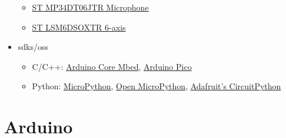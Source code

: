 \documentclass[aspectratio=169]{beamer}
\begin{document}
\begin{frame}
\begin{itemize}
\begin{itemize}
                  \item \href{https://www.st.com/resource/en/datasheet/mp34dt06j.pdf}{ST MP34DT06JTR  Microphone}
                  \item \href{https://www.st.com/resource/en/datasheet/lsm6dsox.pdf}{ST LSM6DSOXTR 6-axis }
              \end{itemize}
        \item \aclp{sdk}/\aclp{os}
              \begin{itemize}
                  \item C/C++: \href{https://github.com/arduino/ArduinoCore-mbed/releases/tag/2.0.0}{Arduino\textregistered{} Core Mbed}, \href{https://github.com/earlephilhower/arduino-pico}{Arduino\textregistered{} Pico}
                  \item Python: \href{https://micropython.org/download/ARDUINO\_NANO\_RP2040\_CONNECT/}{MicroPython}, \href{https://github.com/openmv/openmv/releases}{Open MicroPython}, \href{https://circuitpython.org/board/arduino\_nano\_rp2040\_connect/}{Adafruit's CircuitPython}
              \end{itemize}
    \end{itemize}
\end{frame}

\section{Arduino\textregistered{} }
\end{document}
